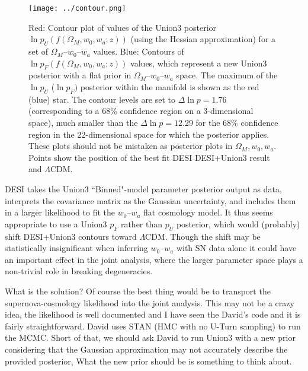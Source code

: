 \documentclass[11pt, oneside]{article}   	%
\begin{document}
\begin{figure}[htbp] %
   \centering
   \texttt{[image: ../contour.png]} 
   \caption{Red: Contour plot of values of the Union3 posterior $\ln{p}_U(f(\Omega_M, w_0, w_a; z))$ (using the Hessian approximation) for a
set of $\Omega_M$--$w_0$--$w_a$ values.
   Blue: Contours of  $\ln{p_F}(f(\Omega_M, w_0, w_a; z))$ values, which represent a new Union3 posterior with a flat prior in  $\Omega_M$--$w_0$--$w_a$ space.   
   The maximum of the $\ln{p}_U$  ($\ln{p}_F)$ posterior within the manifold is shown as the red (blue) star.
   The contour levels are set to $\Delta \ln{p}=1.76$ (corresponding to a 68\% confidence region on a 3-dimensional space), much smaller than the $\Delta \ln{p}=12.29$ for the 68\% confidence region in the 22-dimensional
   space for which the posterior applies. 
   These plots should not be mistaken as posterior plots in  $\Omega_M, w_0, w_a$. 
   Points show the position of the best fit DESI DESI+Union3
   result and  $\Lambda$CDM.}
   \label{fig:posterior}
\end{figure}

DESI takes the Union3 ``Binned"-model parameter posterior output as data, interprets the covariance matrix as the Gaussian uncertainty,
and includes them in a larger likelihood  to fit the $w_0$--$w_a$ flat cosmology model.   It thus seems appropriate
to use a Union3 $p_F$ rather than $p_U$ posterior, which would (probably) shift DESI+Union3 contours toward $\Lambda$CDM.
Though the shift may be statistically insignificant when inferring $w_0$--$w_a$ with SN data alone it could have an important effect in the joint analysis,
where the larger parameter space plays a non-trivial role in breaking degeneracies.

What is the solution? Of course the best thing would be to transport
the supernova-cosmology likelihood into the joint analysis.  This may not be a crazy idea, the likelihood is well documented
and I have seen the David's code and it is fairly straightforward.  David uses STAN  (HMC
with no U-Turn sampling) to run the MCMC.
Short of that, we should ask
David to run Union3 with a new prior considering that the Gaussian approximation may not accurately describe the provided posterior, 
What the new prior should be is something to think about.  
\end{document}
